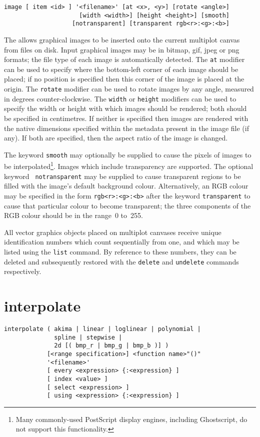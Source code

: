 \begin{verbatim}
image [ item <id> ] '<filename>' [at <x>, <y>] [rotate <angle>]
                     [width <width>] [height <height>] [smooth]
                   [notransparent] [transparent rgb<r>:<g>:<b>]
\end{verbatim}

The  allows graphical images to be inserted onto the current
multiplot canvas from files on disk. Input graphical images may be in bitmap,
gif, jpeg or png formats; the file type of each image is automatically
detected. The {\tt at} modifier can be used to specify where the bottom-left
corner of each image should be placed; if no position is specified then this
corner of the image is placed at the origin. The {\tt rotate} modifier can be
used to rotate images by any angle, measured in degrees counter-clockwise.  The
{\tt width} or {\tt height} modifiers can be used to specify the width or
height with which images should be rendered; both should be specified in
centimetres. If neither is specified then images are rendered with the native
dimensions specified within the metadata present in the image file (if any). If
both are specified, then the aspect ratio of the image is changed.

The keyword {\tt smooth} may optionally be supplied to cause the pixels of
images to be interpolated\footnote{Many commonly-used PostScript display
engines, including Ghostscript, do not support this functionality.}.  Images
which include transparency are supported. The optional keyword {\tt
notransparent} may be supplied to cause transparent regions to be filled with
the image's default background colour. Alternatively, an RGB colour may be
specified in the form {\tt rgb<r>:<g>:<b>} after the keyword {\tt transparent}
to cause that particular colour to become transparent; the three components of
the RGB colour should be in the range~0 to~255.

All vector graphics objects placed on multiplot canvases receive unique
identification numbers which count sequentially from one, and which may be
listed using the {\tt list} command.  By reference to these numbers, they can
be deleted and subsequently restored with the {\tt delete} and {\tt undelete}
commands respectively.


\section{interpolate}

\begin{verbatim}
interpolate ( akima | linear | loglinear | polynomial |
              spline | stepwise |
              2d [( bmp_r | bmp_g | bmp_b )] )
            [<range specification>] <function name>"()"
            '<filename>'
            [ every <expression> {:<expression} ]
            [ index <value> ]
            [ select <expression> ]
            [ using <expression> {:<expression} ]
\end{verbatim}

